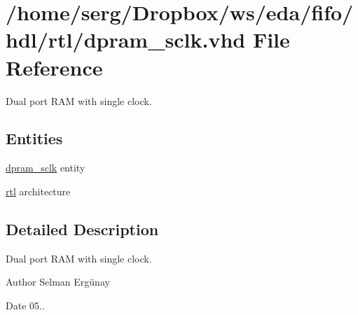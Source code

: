 \hypertarget{dpram__sclk_8vhd}{}\section{/home/serg/\+Dropbox/ws/eda/fifo/hdl/rtl/dpram\+\_\+sclk.vhd File Reference}
\label{dpram__sclk_8vhd}


Dual port R\+AM with single clock.  


\subsection*{Entities}
\begin{DoxyCompactItemize}
\item 
\hyperlink{classdpram__sclk}{dpram\+\_\+sclk} entity
\item 
\hyperlink{classdpram__sclk_1_1rtl}{rtl} architecture
\end{DoxyCompactItemize}


\subsection{Detailed Description}
Dual port R\+AM with single clock. 

\begin{DoxyAuthor}{Author}
Selman Ergünay 
\end{DoxyAuthor}
\begin{DoxyDate}{Date}
05.. 
\end{DoxyDate}
